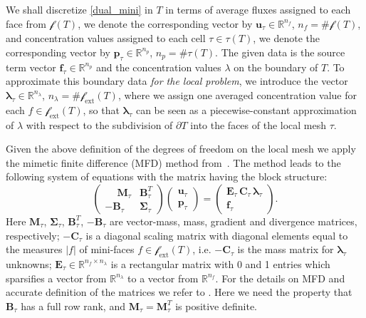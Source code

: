 \documentclass[12pt]{article}
\newcommand{\vect}[1]{\boldsymbol{\mathbf{#1}}}
\newcommand{\bmesh}{{\vect{\mathcal T}}}
\newcommand{\mmesh}{{\vect{\mathcal \tau}}}
\newcommand{\mfaces}[1][]{{\vect{\mathcal f}_{\text{#1}}}}
\begin{document}
	We shall discretize \eqref{dual_mini} in $T$ in terms of average fluxes assigned to each face from $\mfaces(T)$,
	we denote the corresponding vector by ${\vect u}_\mmesh\in\mathbb{R}^{n_f}$, $n_f=\#\mfaces(T)$,  and concentration values assigned to each cell ${\tau \in \mmesh(T)}$, we denote the corresponding vector by ${\vect p}_\mmesh\in\mathbb{R}^{n_p}$, $n_p=\#\mmesh(T)$. The given data is the source term vector ${\vect f}_\mmesh\in \mathbb{R}^{n_p}$ and the concentration values $\lambda$ on the boundary of $T$.
	To approximate this boundary data \emph{for the local problem}, we introduce the vector
	${\vect \lambda}_\mmesh\in\mathbb{R}^{n_\lambda}$, $n_\lambda=\#\mfaces[ext](T)$,
	where we assign one averaged concentration value for each $f\in\mfaces[ext](T)$, so that ${\vect \lambda}_\mmesh$ can be seen as a piecewise-constant approximation of $\lambda$ with respect to the subdivision of $\partial T$ into the faces of the local mesh $\mmesh$.
	
	
	Given the above definition of the degrees of freedom on the local mesh we apply the mimetic finite difference (MFD) method from~\cite{lipnikov2014mimetic}. The method leads to the following system of equations with the matrix having the block structure:
	\begin{equation}\label{local}
		\begin{pmatrix}
			\phantom{-}\vect M_\mmesh & \vect B^T_\mmesh \\
			-\vect B_\mmesh & \vect \Sigma_\mmesh
		\end{pmatrix}
		\begin{pmatrix}
			{\vect u}_\mmesh \\
			{\vect p}_\mmesh
		\end{pmatrix}
		=
		\begin{pmatrix}
			\vect E_\mmesh\,\vect C_\mmesh\,{\vect \lambda}_\mmesh \\
			{\vect f}_\mmesh
		\end{pmatrix}.
	\end{equation}
	Here $\vect M_\mmesh$, $\vect\Sigma_\mmesh$, $\vect B^T_\mmesh$, $-\vect B_\mmesh$ are vector-mass, mass, gradient and divergence matrices, respectively; {\color{blue}$-\vect C_\mmesh$ is a diagonal scaling matrix  with diagonal elements equal to the measures $|f|$ of mini-faces $f \in \mfaces[ext](T)$, i.e. $-\vect C_\mmesh$ is the mass matrix for ${\vect \lambda}_\mmesh$ unknowns};
	$\vect E_\mmesh \in \mathbb{R}^{n_f \times n_\lambda}$ is a rectangular matrix with 0 and 1 entries which sparsifies a vector from  $\mathbb{R}^{n_{\lambda}}$
	to a vector from  $\mathbb{R}^{n_{f}}$.
	For the details on MFD and accurate definition of the matrices we refer to \cite{lipnikov2014mimetic,MFDbook}.
	Here we need the property that  $\vect B_\mmesh$ has a full row rank, and $\vect M_\mmesh = \vect M^T_\mmesh$ is positive definite.
	
\end{document}
